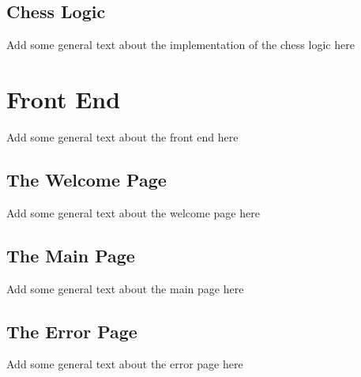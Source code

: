 \subsection{Chess Logic}

Add some general text about the implementation of the chess logic here

\section{Front End}

Add some general text about the front end here

\subsection{The Welcome Page}

Add some general text about the welcome page here

\subsection{The Main Page}

Add some general text about the main page here

\subsection{The Error Page}

Add some general text about the error page here